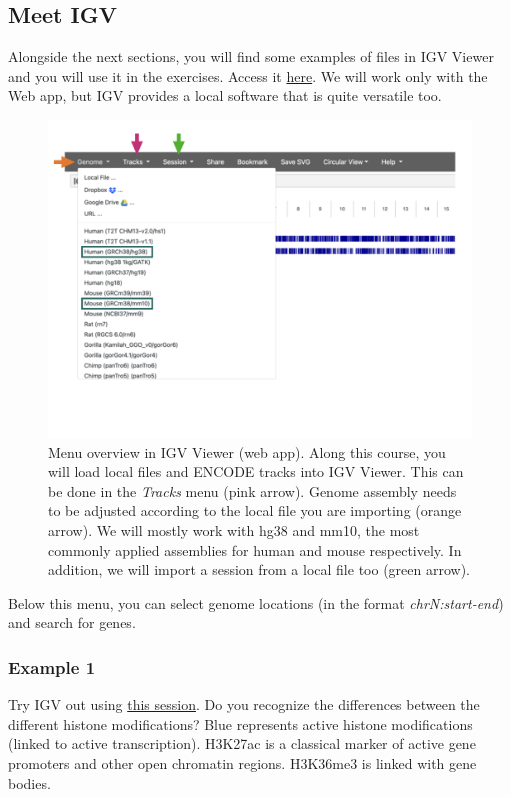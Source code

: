 \documentclass[
]{book}
\begin{document}
\hypertarget{meet-igv}{%
\subsection{Meet IGV}\label{meet-igv}}

Alongside the next sections, you will find some examples of files in IGV Viewer and you will use it in the exercises. Access it \href{https://igv.org/app/}{here}. We will work only with the Web app, but IGV provides a local software that is quite versatile too.

\begin{figure}
\centering
\includegraphics{figures/IGVintro.png}
\caption{Menu overview in IGV Viewer (web app). Along this course, you will load local files and ENCODE tracks into IGV Viewer. This can be done in the \emph{Tracks} menu (pink arrow). Genome assembly needs to be adjusted according to the local file you are importing (orange arrow). We will mostly work with hg38 and mm10, the most commonly applied assemblies for human and mouse respectively. In addition, we will import a session from a local file too (green arrow).}
\end{figure}

Below this menu, you can select genome locations (in the format \emph{chrN:start-end}) and search for genes.

\hypertarget{example-1}{%
\subsubsection{Example 1}\label{example-1}}

Try IGV out using \href{IGV_sessions/heart_Histones.json}{this session}.
Do you recognize the differences between the different histone modifications? Blue represents active histone modifications (linked to active transcription). H3K27ac is a classical marker of active gene promoters and other open chromatin regions. H3K36me3 is linked with gene bodies.
\end{document}
